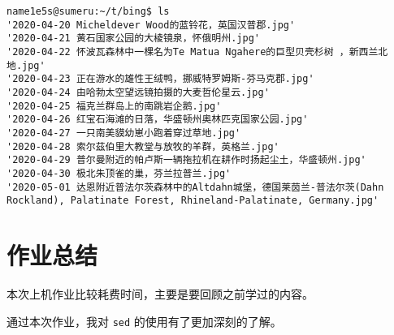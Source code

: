 \documentclass[blue,normal,cn]{elegantnote}
\newcommand{\code}[1]{\colorbox{light-gray}{\texttt{#1}}}
\begin{document}
\begin{lstlisting}
name1e5s@sumeru:~/t/bing$ ls
'2020-04-20 Micheldever Wood的蓝铃花，英国汉普郡.jpg'
'2020-04-21 黄石国家公园的大棱镜泉，怀俄明州.jpg'
'2020-04-22 怀波瓦森林中一棵名为Te Matua Ngahere的巨型贝壳杉树 ，新西兰北地.jpg'
'2020-04-23 正在游水的雄性王绒鸭，挪威特罗姆斯-芬马克郡.jpg'
'2020-04-24 由哈勃太空望远镜拍摄的大麦哲伦星云.jpg'
'2020-04-25 福克兰群岛上的南跳岩企鹅.jpg'
'2020-04-26 红宝石海滩的日落，华盛顿州奥林匹克国家公园.jpg'
'2020-04-27 一只南美貘幼崽小跑着穿过草地.jpg'
'2020-04-28 索尔茲伯里大教堂与放牧的羊群，英格兰.jpg'
'2020-04-29 普尔曼附近的帕卢斯一辆拖拉机在耕作时扬起尘土，华盛顿州.jpg'
'2020-04-30 极北朱顶雀的巢，芬兰拉普兰.jpg'
'2020-05-01 达恩附近普法尔茨森林中的Altdahn城堡，德国莱茵兰-普法尔茨(Dahn Rockland), Palatinate Forest, Rhineland-Palatinate, Germany.jpg'
\end{lstlisting}

\section{作业总结}

本次上机作业比较耗费时间，主要是要回顾之前学过的内容。

通过本次作业，我对 \code{sed} 的使用有了更加深刻的了解。
\end{document}
